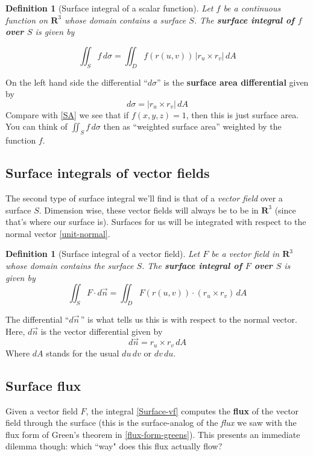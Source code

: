 \documentclass[12pt]{article}
\numberwithin{equation}{subsection}
\numberwithin{figure}{subsection}
\newtheorem{defn}[subsection]{Definition}
\theoremstyle{note}
\begin{document}
{\begin{defn}[Surface integral of a scalar function]Let $f$ be a continuous function on $\mathbf{R}^3$ whose domain contains a surface $S$. The \textbf{surface integral of $f$ over $S$} is given by

\begin{equation} 
	\label{Surface-func}
	\iint_{S} f \,d\sigma= \iint_D f\left(r(u,v)\right) \, |r_u \times r_v| \,dA
\end{equation}
\end{defn}
On the left hand side the differential ``$d\sigma$'' is the \textbf{surface area differential} given by \begin{equation} d\sigma= |r_u \times r_v| \,dA\end{equation} Compare with \eqref{SA} we see that if $f(x,y,z)=1$, then this is just surface area. You can think of $\iint_{S} f\,d\sigma$ then as ``weighted surface area'' weighted by the function $f$. 

\subsection{Surface integrals of vector fields} The second type of surface integral we'll find is that of a \textit{vector field} over a surface $S$. Dimension wise, these vector fields will always be to be in $\mathbf{R}^3$ (since that's where our surface is). Surfaces for us will be integrated with respect to the normal vector \eqref{unit-normal}.

\begin{defn}[Surface integral of a vector field] Let $F$ be a vector field in $\mathbf{R}^3$ whose domain contains the surface $S$. The \textbf{surface integral of $F$ over $S$} is given by 
\begin{equation}
	\label{Surface-vf}
	\iint_{S} F\cdot d\vec{n} = \iint_D  F(r(u,v)) \cdot (r_u \times r_v) \,dA	
\end{equation}
\end{defn}

The differential ``$d\vec{n}$\,'' is what tells us this is with respect to the normal vector. Here, $d\vec{n}$ is the vector differential given by \begin{equation} d\vec{n}= r_u \times r_v \,dA\end{equation} Where $dA$ stands for the usual $du \,dv$ or $dv\,du$. %

\subsection{Surface flux} Given a vector field $F$, the integral \eqref{Surface-vf} computes the \textbf{flux} of the vector field through the surface (this is the surface-analog of the \textit{flux} we saw with the flux form of Green's theorem in \ref{flux-form-greens}). This presents an immediate dilemma though: which ``way" does this flux actually flow? 

}
\end{document}

